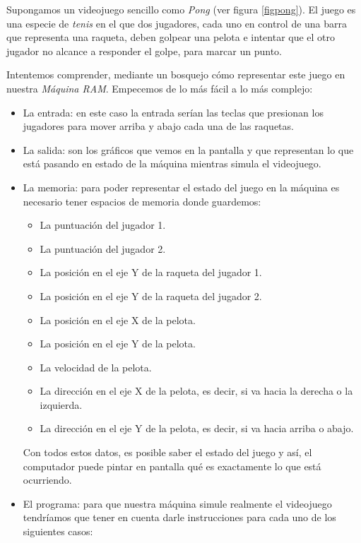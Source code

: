 Supongamos un videojuego sencillo como \emph{Pong} (ver figura \ref{figpong}). El juego es una especie de \emph{tenis} en el que dos jugadores, cada uno en control de una barra que representa una raqueta, deben golpear una pelota e intentar que el otro jugador no alcance a responder el golpe, para marcar un punto. 

Intentemos comprender, mediante un bosquejo cómo representar este juego en nuestra \emph{Máquina RAM}. Empecemos de lo más fácil a lo más complejo:

\begin{itemize}

	
	\item La entrada: en este caso la entrada serían las teclas que presionan los jugadores para mover arriba y abajo cada una de las raquetas.
	
	\item La salida: son los gráficos que vemos en la pantalla y que representan lo que está pasando en estado de la máquina mientras simula el videojuego.
	
	\item La memoria: para poder representar el estado del juego en la máquina es necesario tener espacios de memoria donde guardemos:
	
	\begin{itemize}
		\item La puntuación del jugador 1.
		\item La puntuación del jugador 2.
		\item La posición en el eje Y de la raqueta del jugador 1.
		\item La posición en el eje Y de la raqueta del jugador 2.
		\item La posición en el eje X de la pelota.
		\item La posición en el eje Y de la pelota.
		\item La velocidad de la pelota.
		\item La dirección en el eje X de la pelota, es decir, si va hacia la derecha o la izquierda.
		\item La dirección en el eje Y de la pelota, es decir, si va hacia arriba o abajo.
	\end{itemize}

	Con todos estos datos, es posible saber el estado del juego y así, el computador puede pintar en pantalla qué es exactamente lo que está ocurriendo.
	
	\item El programa: para que nuestra máquina simule realmente el videojuego tendríamos que tener en cuenta darle instrucciones para cada uno de los siguientes casos: 
	

\end{itemize}
